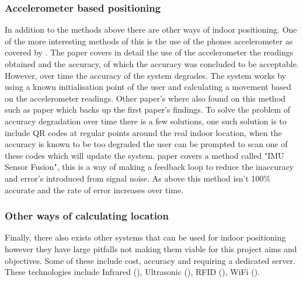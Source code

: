 \subsubsection{Accelerometer based positioning}
In addition to the methods above there are other ways of indoor positioning. One of the more interesting methods of this is the use of the phones accelerometer as covered by \cite{nagpalparamvirsingh_2013_indoor}. The paper covers in detail the use of the accelerometer the readings obtained and the accuracy, of which the accuracy was concluded to be acceptable. However, over time the accuracy of the system degrades. The system works by using a known initialisation point of the user and calculating a movement based on the accelerometer readings. Other paper's where also found on this method such as \cite{palma_2017_evolution} paper which backs up the first paper's findings. To solve the problem of accuracy degradation over time there is a few solutions, one such solution is to include QR codes at regular points around the real indoor location, when the accuracy is known to be too degraded the user can be prompted to scan one of these codes which will update the system. \cite{comer_uwb_vs_ble} paper covers a method called "IMU Sensor Fusion", this is a way of making a feedback loop to reduce the inaccuracy and error's introduced from signal noise. As above this method isn't 100\% accurate and the rate of error increases over time. 

\subsubsection{Other ways of calculating location}
Finally, there also exists other systems that can be used for indoor positioning however they have large pitfalls not making them viable for this project aims and objectives. Some of these include cost, accuracy and requiring a dedicated server. These technologies include Infrared (\cite{palma_2017_evolution}), Ultrasonic (\cite{qi_2017_a}), RFID (\cite{kim_2013_rfidbased}), WiFi (\cite{duyuanfeng_2016_flexible}). 
